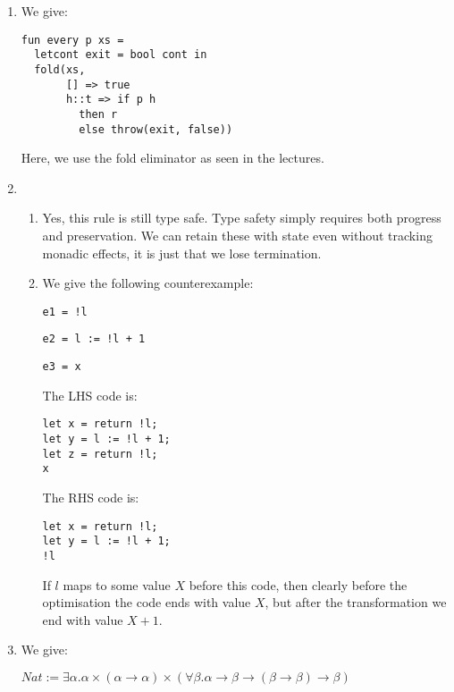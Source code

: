 


\begin{enumerate}[label=(\alph*)]

  \item
    We give:

\begin{verbatim}
fun every p xs = 
  letcont exit = bool cont in
  fold(xs,
       [] => true
       h::t => if p h
         then r
         else throw(exit, false))
\end{verbatim}

Here, we use the fold eliminator as seen in the lectures.

\item
  \begin{enumerate}[label=(\roman*)]

    \item
      
  Yes, this rule is still type safe. Type safety simply requires both progress and preservation. We can retain these with state even without tracking monadic effects, it is just that we lose termination.

  \item

    We give the following counterexample:

    \texttt{e1 = !l}

    \texttt{e2 = l := !l + 1}

    \texttt{e3 = x}

    The LHS code is:

\begin{verbatim}
let x = return !l;
let y = l := !l + 1;
let z = return !l;
x
\end{verbatim}

The RHS code is:

\begin{verbatim}
let x = return !l;
let y = l := !l + 1;
!l
\end{verbatim}

If $l$ maps to some value $X$ before this code, then clearly before the optimisation the code ends with value $X$, but after the transformation we  end with value $X+1$.
  \end{enumerate}

  \item
    We give:

    $Nat := \exists \alpha. \alpha \times (\alpha \rightarrow \alpha) \times (\forall \beta. \alpha \rightarrow \beta \rightarrow (\beta \rightarrow \beta) \rightarrow \beta)$


\end{enumerate}
